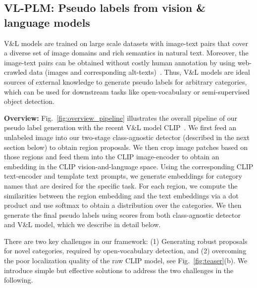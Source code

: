 \documentclass[runningheads]{llncs}
\begin{document}
\subsection{VL-PLM: Pseudo labels from vision \& language models}
\label{sec:method_pl_with_vl}
V\&L models are trained on large scale datasets with image-text pairs that cover a diverse set of image domains and rich semantics in natural text.  Moreover, the image-text pairs can be obtained without costly human annotation by using web-crawled data (images and corresponding alt-texts)~\cite{radford_arxiv_2021,jia_icml_21}.   Thus, V\&L models are ideal sources of external knowledge to generate pseudo labels for arbitrary categories, which can be used for downstream tasks like open-vocabulary or semi-supervised object detection. 

\vspace{1mm}
\noindent \textbf{Overview:}
Fig.~\ref{fig:overview_pipeline} illustrates the overall pipeline of our pseudo label generation with the recent V\&L model CLIP~\cite{radford_arxiv_2021}.  We first feed an unlabeled image into our two-stage class-agnostic detector (described in the next section below) to obtain region proposals.  We then crop image patches based on those regions and feed them into the CLIP image-encoder to obtain an embedding in the CLIP vision-and-language space.  Using the corresponding CLIP text-encoder and template text prompts, we generate embeddings for category names that are desired for the specific task.
For each region, we compute the similarities between the region embedding and the text embeddings via a dot product and use softmax to obtain a distribution over the categories. 
We then generate the final pseudo labels using scores from both class-agnostic detector and V\&L model, which we describe in detail below.

There are two key challenges in our framework: (1) Generating robust proposals for novel categories, required by open-vocabulary detection, and (2) overcoming the poor localization quality of the raw CLIP model, see Fig.~\ref{fig:teaser}(b).  We introduce simple but effective solutions to address the two challenges in the following.
\end{document}
